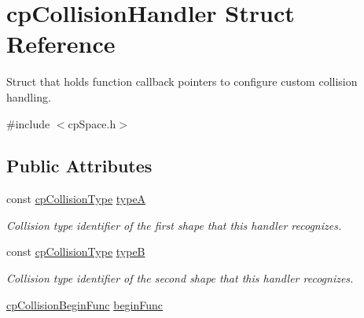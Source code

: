 \hypertarget{structcp_collision_handler}{}\section{cp\+Collision\+Handler Struct Reference}
\label{structcp_collision_handler}


Struct that holds function callback pointers to configure custom collision handling.  




{\ttfamily \#include $<$cp\+Space.\+h$>$}

\subsection*{Public Attributes}
\begin{DoxyCompactItemize}
\item 
const \hyperlink{group__basic_types_gae83e2f50965eb441e36ffff1e32e6d02}{cp\+Collision\+Type} \hyperlink{structcp_collision_handler_a07bbc9d26af9d41cc87bae6514930d9f}{type\+A}
\begin{DoxyCompactList}\small\item\em Collision type identifier of the first shape that this handler recognizes. \end{DoxyCompactList}\item 
const \hyperlink{group__basic_types_gae83e2f50965eb441e36ffff1e32e6d02}{cp\+Collision\+Type} \hyperlink{structcp_collision_handler_a7f9def10b179d18de37bec5b3c6d8621}{type\+B}
\begin{DoxyCompactList}\small\item\em Collision type identifier of the second shape that this handler recognizes. \end{DoxyCompactList}\item 
\hypertarget{structcp_collision_handler_a64f552c94d44dfd3844869ea9dada78f}{}\hyperlink{group__cp_space_ga3134f145bfc7ca4ef69b350978c26a5a}{cp\+Collision\+Begin\+Func} \hyperlink{structcp_collision_handler_a64f552c94d44dfd3844869ea9dada78f}{begin\+Func}\label{structcp_collision_handler_a64f552c94d44dfd3844869ea9dada78f}


\end{DoxyCompactItemize}
